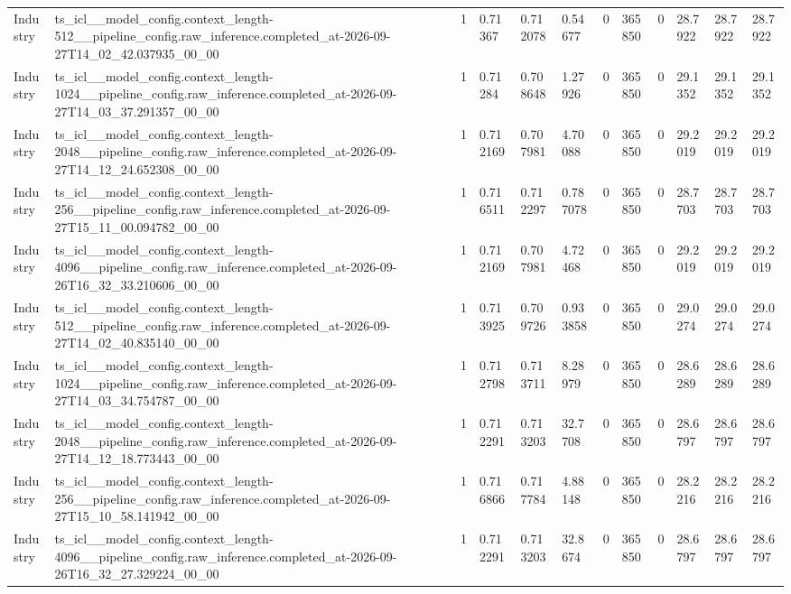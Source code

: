 \begin{tabular}{llllllllllll}
Industry & ts\_icl\_\_model\_config.context\_length-512\_\_pipeline\_config.raw\_inference.completed\_at-2026-09-27T14\_02\_42.037935\_00\_00 & 1 & 0.71367 & 0.712078 & 0.54677 & 0 & 365850 & 0 & 28.7922 & 28.7922 & 28.7922 \\
Industry & ts\_icl\_\_model\_config.context\_length-1024\_\_pipeline\_config.raw\_inference.completed\_at-2026-09-27T14\_03\_37.291357\_00\_00 & 1 & 0.71284 & 0.708648 & 1.27926 & 0 & 365850 & 0 & 29.1352 & 29.1352 & 29.1352 \\
Industry & ts\_icl\_\_model\_config.context\_length-2048\_\_pipeline\_config.raw\_inference.completed\_at-2026-09-27T14\_12\_24.652308\_00\_00 & 1 & 0.712169 & 0.707981 & 4.70088 & 0 & 365850 & 0 & 29.2019 & 29.2019 & 29.2019 \\
Industry & ts\_icl\_\_model\_config.context\_length-256\_\_pipeline\_config.raw\_inference.completed\_at-2026-09-27T15\_11\_00.094782\_00\_00 & 1 & 0.716511 & 0.712297 & 0.787078 & 0 & 365850 & 0 & 28.7703 & 28.7703 & 28.7703 \\
Industry & ts\_icl\_\_model\_config.context\_length-4096\_\_pipeline\_config.raw\_inference.completed\_at-2026-09-26T16\_32\_33.210606\_00\_00 & 1 & 0.712169 & 0.707981 & 4.72468 & 0 & 365850 & 0 & 29.2019 & 29.2019 & 29.2019 \\
Industry & ts\_icl\_\_model\_config.context\_length-512\_\_pipeline\_config.raw\_inference.completed\_at-2026-09-27T14\_02\_40.835140\_00\_00 & 1 & 0.713925 & 0.709726 & 0.933858 & 0 & 365850 & 0 & 29.0274 & 29.0274 & 29.0274 \\
Industry & ts\_icl\_\_model\_config.context\_length-1024\_\_pipeline\_config.raw\_inference.completed\_at-2026-09-27T14\_03\_34.754787\_00\_00 & 1 & 0.712798 & 0.713711 & 8.28979 & 0 & 365850 & 0 & 28.6289 & 28.6289 & 28.6289 \\
Industry & ts\_icl\_\_model\_config.context\_length-2048\_\_pipeline\_config.raw\_inference.completed\_at-2026-09-27T14\_12\_18.773443\_00\_00 & 1 & 0.712291 & 0.713203 & 32.7708 & 0 & 365850 & 0 & 28.6797 & 28.6797 & 28.6797 \\
Industry & ts\_icl\_\_model\_config.context\_length-256\_\_pipeline\_config.raw\_inference.completed\_at-2026-09-27T15\_10\_58.141942\_00\_00 & 1 & 0.716866 & 0.717784 & 4.88148 & 0 & 365850 & 0 & 28.2216 & 28.2216 & 28.2216 \\
Industry & ts\_icl\_\_model\_config.context\_length-4096\_\_pipeline\_config.raw\_inference.completed\_at-2026-09-26T16\_32\_27.329224\_00\_00 & 1 & 0.712291 & 0.713203 & 32.8674 & 0 & 365850 & 0 & 28.6797 & 28.6797 & 28.6797 \\

\end{tabular}
